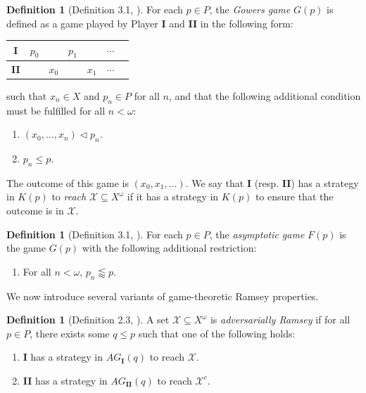 \documentclass[11pt,reqno]{amsart}
\theoremstyle{plain}
\numberwithin{equation}{section}
\theoremstyle{definition}
\newtheorem{definition}[theorem]{Definition}
\newcommand{\cal}{\mathcal}
\newcommand{\X}{\cal{X}}
\begin{document}
\begin{definition}[Definition 3.1, \cite{d20}]
    For each $p \in P$, the \emph{Gowers game} $G(p)$ is defined as a game played by Player \textbf{I} and \textbf{II} in the following form:
    \begin{center}
        \begin{tabular}{c|cccccc}
            \textbf{I} & $p_0$ & & $p_1$ & & $\cdots$ \\
            \hline
            \textbf{II} & & $x_0$ & & $x_1$ & $\cdots$ \\
        \end{tabular}
    \end{center}
    such that $x_n \in X$ and $p_n \in P$ for all $n$, and that the following additional condition must be fulfilled for all $n < \omega$:
    \begin{enumerate}
        \item $(x_0,\dots,x_n) \lhd p_n$.

        \item $p_n \leq p$.
    \end{enumerate}
    The outcome of this game is $(x_0,x_1,\dots)$. We say that \textbf{I} (resp. \textbf{II}) has a strategy in $K(p)$ to \emph{reach} $\X \subseteq X^\omega$ if it has a strategy in $K(p)$ to ensure that the outcome is in $\X$. 
\end{definition}

\begin{definition}[Definition 3.1, \cite{d20}]
    For each $p \in P$, the \emph{asymptotic game} $F(p)$ is the game $G(p)$ with the following additional restriction:
    \begin{enumerate}
        \item For all $n < \omega$, $p_n \lessapprox p$.
    \end{enumerate}
\end{definition}

We now introduce several variants of game-theoretic Ramsey properties.

\begin{definition}[Definition 2.3, \cite{d20}]
    A set $\X \subseteq X^\omega$ is \emph{adversarially Ramsey} if for all $p \in P$, there exists some $q \leq p$ such that one of the following holds:
    \begin{enumerate}
        \item \textbf{I} has a strategy in $AG_\textbf{I}(q)$ to reach $\X$.

        \item \textbf{II} has a strategy in $AG_\textbf{II}(q)$ to reach $\X^c$.
    \end{enumerate}
\end{definition}
\end{document}
